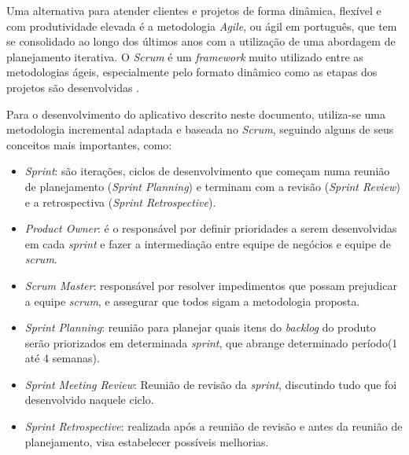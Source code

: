 Uma alternativa para atender clientes e projetos de forma din\^amica, flex\'ivel e com produtividade elevada \'e a metodologia \textit{Agile}, ou \'agil em portugu\^es, que tem se consolidado ao longo dos \'ultimos anos com a utiliza\c{c}\~ao de uma abordagem de planejamento iterativa. O \textit{Scrum} \'e um \textit{framework} muito utilizado entre as metodologias \'ageis, especialmente pelo formato din\^amico como as etapas dos projetos s\~ao desenvolvidas \cite{Udacity2017}. 

Para o desenvolvimento do aplicativo descrito neste documento, utiliza-se uma metodologia incremental adaptada e baseada no \textit{Scrum}, seguindo alguns de seus conceitos mais importantes, como: 

\begin{itemize}
	
	\item \textit{Sprint}: s\~ao itera\c{c}\~oes, ciclos de desenvolvimento que come\c{c}am numa reuni\~ao de planejamento (\textit{Sprint Planning}) e terminam com a revis\~ao (\textit{Sprint Review}) e a retrospectiva (\textit{Sprint Retrospective}).
	
	\item \textit{Product Owner}: \'e o respons\'avel por definir prioridades a serem desenvolvidas em cada \textit{sprint} e fazer a intermedia\c{c}\~ao entre equipe de neg\'ocios e equipe de \textit{scrum}.
	
	\item \textit{Scrum Master}: respons\'avel por resolver impedimentos que possam prejudicar a equipe \textit{scrum}, e assegurar que todos sigam a metodologia proposta. 
	
	\item \textit{Sprint Planning}: reuni\~ao para planejar quais itens do \textit{backlog} do produto ser\~ao priorizados em determinada \textit{sprint}, que abrange determinado per\'iodo(1 at\'e 4 semanas).
	
	\item  \textit{Sprint Meeting Review}: Reuni\~ao de revis\~ao da \textit{sprint}, discutindo tudo que foi desenvolvido naquele ciclo. 
	
	\item \textit{Sprint Retrospective}: realizada ap\'os a reuni\~ao de revis\~ao e antes da reuni\~ao de planejamento, visa estabelecer poss\'iveis melhorias. 
		
\end{itemize}




